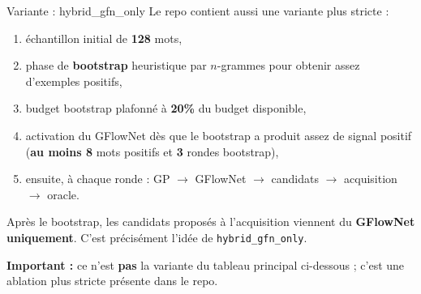 \documentclass[aspectratio=169,10pt]{beamer}
\newcommand{\code}[1]{\texttt{#1}}
\begin{document}
\begin{frame}{Variante : hybrid\_gfn\_only}
\justifying
\small
Le repo contient aussi une variante plus stricte :
\begin{enumerate}
  \item échantillon initial de \textbf{128} mots,
  \item phase de \textbf{bootstrap} heuristique par \(n\)-grammes pour obtenir
  assez d'exemples positifs,
  \item budget bootstrap plafonné à \textbf{20\%} du budget disponible,
  \item activation du GFlowNet dès que le bootstrap a produit assez de signal
  positif (\textbf{au moins 8} mots positifs et \textbf{3} rondes bootstrap),
  \item ensuite, à chaque ronde : GP \(\rightarrow\) GFlowNet
  \(\rightarrow\) candidats \(\rightarrow\) acquisition \(\rightarrow\) oracle.
\end{enumerate}

\vspace{0.4em}
Après le bootstrap, les candidats proposés à l'acquisition viennent du
\textbf{GFlowNet uniquement}. C'est précisément l'idée de
\code{hybrid\_gfn\_only}.

\vspace{0.4em}
\textbf{Important :} ce n'est \textbf{pas} la variante du tableau principal
ci-dessous ; c'est une ablation plus stricte présente dans le repo.
\end{frame}
\end{document}
